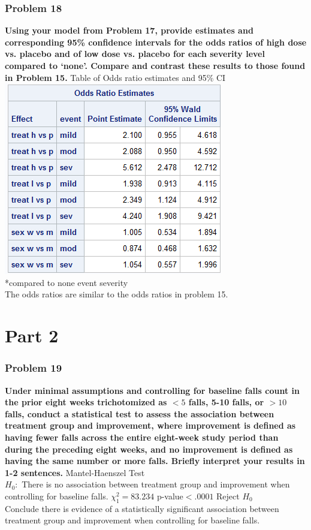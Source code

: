 \documentclass{article}
\begin{document}
\begin{flushleft}
\section*{Problem 18}
\textbf{Using your model from Problem 17, provide estimates and corresponding 95\% confidence intervals
for the odds ratios of high dose vs. placebo and of low dose vs. placebo for each severity level
compared to ‘none’. Compare and contrast these results to those found in Problem 15.}\medbreak
Table of Odds ratio estimates and 95\% CI\\
\includegraphics[scale=.6]{org.png}\\
*compared to none event severity\\ 
The odds ratios are similar to the odds ratios in problem 15.
\pagebreak
\part*{Part 2}
\section*{Problem 19}
\textbf{Under minimal assumptions and controlling for baseline falls count in the prior eight weeks
trichotomized as $<5$ falls, 5-10 falls, or $>10$ falls, conduct a statistical test to assess the association
between treatment group and improvement, where improvement is defined as having fewer falls
across the entire eight-week study period than during the preceding eight weeks, and no improvement
is defined as having the same number or more falls. Briefly interpret your results in 1-2 sentences.}\medbreak
Mantel-Haenszel Test\\
$H_0:$ There is no association between treatment group and improvement when controlling for baseline falls. 
 $\chi^2_1=83.234$ p-value$<.0001$ Reject $H_0$\\
 Conclude there is evidence of a statistically significant association between treatment group and improvement when controlling for baseline falls. 
 \pagebreak

\end{flushleft}
\end{document}
